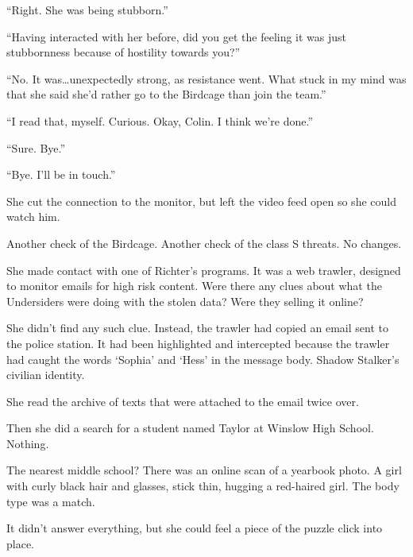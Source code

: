 ``Right.  She was being stubborn.''



``Having interacted with her before, did you get the feeling it was just stubbornness because of hostility towards you?''



``No.  It was\ldots unexpectedly strong, as resistance went.  What stuck in my mind was that she said she'd rather go to the Birdcage than join the team.''



``I read that, myself.  Curious.  Okay, Colin.  I think we're done.''



``Sure.  Bye.''



``Bye.  I'll be in touch.''



She cut the connection to the monitor, but left the video feed open so she could watch him.



Another check of the Birdcage.  Another check of the class S threats.  No changes.



She made contact with one of Richter's programs.  It was a web trawler, designed to monitor emails for high risk content.  Were there any clues about what the Undersiders were doing with the stolen data?  Were they selling it online?



She didn't find any such clue.  Instead, the trawler had copied an email sent to the police station.  It had been highlighted and intercepted because the trawler had caught the words `Sophia' and `Hess' in the message body.  Shadow Stalker's civilian identity.



She read the archive of texts that were attached to the email twice over.



Then she did a search for a student named Taylor at Winslow High School.  Nothing.



The nearest middle school?  There was an online scan of a yearbook photo.  A girl with curly black hair and glasses, stick thin, hugging a red-haired girl.  The body type was a match.



It didn't answer everything, but she could feel a piece of the puzzle click into place.



